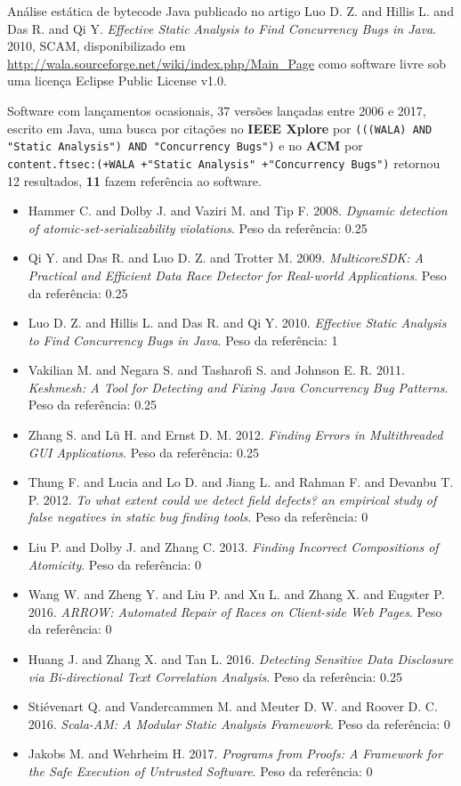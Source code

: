 Análise estática de bytecode Java
publicado no artigo
Luo D. Z. and Hillis L. and Das R. and Qi Y.
{\it Effective Static Analysis to Find Concurrency Bugs in Java}.
2010,
SCAM,
disponibilizado em \url{http://wala.sourceforge.net/wiki/index.php/Main_Page}
como software livre
sob uma licença Eclipse Public License v1.0.

Software com lançamentos ocasionais,
37 versões lançadas
entre 2006 e 2017,
escrito em Java,
uma busca por citações no {\bf IEEE Xplore} por
\texttt{(((WALA) AND "Static Analysis") AND "Concurrency Bugs")}
e no {\bf ACM} por
\texttt{content.ftsec:(+WALA +"Static Analysis" +"Concurrency Bugs")}
retornou
12 resultados,
{\bf 11} fazem referência ao software.

\begin{itemize}
\item Hammer C. and Dolby J. and Vaziri M. and Tip F.
      2008.
      {\it Dynamic detection of atomic-set-serializability violations}.
      Peso da referência: 0.25
\item Qi Y. and Das R. and Luo D. Z. and Trotter M.
      2009.
      {\it MulticoreSDK: A Practical and Efficient Data Race Detector for Real-world Applications}.
      Peso da referência: 0.25
\item Luo D. Z. and Hillis L. and Das R. and Qi Y.
      2010.
      {\it Effective Static Analysis to Find Concurrency Bugs in Java}.
      Peso da referência: 1
\item Vakilian M. and Negara S. and Tasharofi S. and Johnson E. R.
      2011.
      {\it Keshmesh: A Tool for Detecting and Fixing Java Concurrency Bug Patterns}.
      Peso da referência: 0.25
\item Zhang S. and L\"{u} H. and Ernst D. M.
      2012.
      {\it Finding Errors in Multithreaded GUI Applications}.
      Peso da referência: 0.25
\item Thung F. and Lucia and Lo D. and Jiang L. and Rahman F. and Devanbu T. P.
      2012.
      {\it To what extent could we detect field defects? an empirical study of false negatives in static bug finding tools}.
      Peso da referência: 0
\item Liu P. and Dolby J. and Zhang C.
      2013.
      {\it Finding Incorrect Compositions of Atomicity}.
      Peso da referência: 0
\item Wang W. and Zheng Y. and Liu P. and Xu L. and Zhang X. and Eugster P.
      2016.
      {\it ARROW: Automated Repair of Races on Client-side Web Pages}.
      Peso da referência: 0
\item Huang J. and Zhang X. and Tan L.
      2016.
      {\it Detecting Sensitive Data Disclosure via Bi-directional Text Correlation Analysis}.
      Peso da referência: 0.25
\item Stiévenart Q. and Vandercammen M. and Meuter D. W. and Roover D. C.
      2016.
      {\it Scala-AM: A Modular Static Analysis Framework}.
      Peso da referência: 0
\item Jakobs M. and Wehrheim H.
      2017.
      {\it Programs from Proofs: A Framework for the Safe Execution of Untrusted Software}.
      Peso da referência: 0
\end{itemize}

